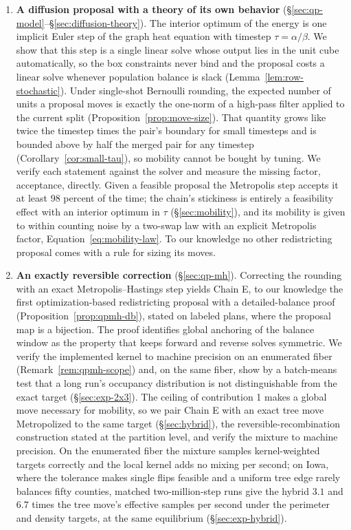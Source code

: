 \documentclass[11pt]{article}
\begin{document}
\begin{enumerate}
  \item \textbf{A diffusion proposal with a theory of its own
    behavior} (\S\ref{sec:qp-model}--\S\ref{sec:diffusion-theory}).
    The interior optimum of the energy is one implicit Euler step of
    the graph heat equation with timestep $\tau = \alpha/\beta$. We
    show that this step is a single linear solve whose output lies in
    the unit cube automatically, so the box constraints never bind
    and the proposal costs a linear solve whenever population balance
    is slack (Lemma~\ref{lem:row-stochastic}). Under single-shot
    Bernoulli rounding, the expected number of units a proposal moves
    is exactly the one-norm of a high-pass filter applied to the
    current split (Proposition~\ref{prop:move-size}). That quantity
    grows like twice the timestep times the pair's boundary for small
    timesteps and is bounded above by half the merged pair for any
    timestep (Corollary~\ref{cor:small-tau}), so mobility cannot be
    bought by tuning. We verify each statement against the solver
    and measure the missing factor, acceptance, directly. Given a
    feasible proposal the Metropolis step accepts it at least 98
    percent of the time; the chain's stickiness is entirely a
    feasibility effect with an interior optimum in $\tau$
    (\S\ref{sec:mobility}), and its mobility is given to within
    counting noise by a two-swap law with an explicit Metropolis
    factor, Equation~\eqref{eq:mobility-law}. To our knowledge no
    other redistricting proposal comes with a rule for sizing its
    moves.

  \item \textbf{An exactly reversible correction}
    (\S\ref{sec:qp-mh}). Correcting the rounding with an exact
    Metropolis--Hastings step yields Chain E, to our knowledge the
    first optimization-based redistricting proposal with a
    detailed-balance proof (Proposition~\ref{prop:qpmh-db}), stated
    on labeled plans, where the proposal map is a bijection. The
    proof identifies global anchoring of the balance window as the
    property that keeps forward and reverse solves symmetric. We
    verify the implemented kernel to machine precision on an
    enumerated fiber (Remark~\ref{rem:qpmh-scope}) and, on the same
    fiber, show by a batch-means test that a long run's occupancy
    distribution is not distinguishable from the exact target
    (\S\ref{sec:exp-2x3}). The ceiling of contribution 1 makes a
    global move necessary for mobility, so we pair Chain E with an
    exact tree move Metropolized to the same target
    (\S\ref{sec:hybrid}), the reversible-recombination construction
    stated at the partition level, and verify the mixture to machine
    precision. On the enumerated fiber the mixture samples
    kernel-weighted targets correctly and the local kernel adds no
    mixing per second; on Iowa, where the tolerance makes single
    flips feasible and a uniform tree edge rarely balances fifty
    counties, matched two-million-step runs give the hybrid $3.1$ and
    $6.7$ times the tree move's effective samples per second under
    the perimeter and density targets, at the same equilibrium
    (\S\ref{sec:exp-hybrid}).


\end{enumerate}
\end{document}
